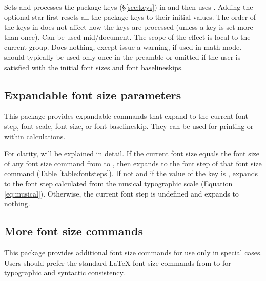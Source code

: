 \documentclass{beery}
\begin{document}
Sets and processes the  package keys (\S\ref{sec:keys}) in  and then uses .
Adding the optional star \sarg{} first resets all the  package keys to their initial values.
The order of the keys in  does not affect how the keys are processed (unless a key is set more than once).
Can be used mid\-/document.
The scope of the effect is local to the current group.
Does nothing, except issue a warning, if used in math mode.
 should typically be used only once in the preamble or omitted if the user is satisfied with the initial font sizes and font baselineskips.

\subsection{Expandable font size parameters}
\label{subsec:expandable}

\begin{mydisplaycode}
  \nopagebreak\newline
  \newline
  \nopagebreak\newline
\end{mydisplaycode}

This package provides expandable commands that expand to the current font step, font scale, font size, or font baselineskip.
They can be used for printing or within calculations.

For clarity,  will be explained in detail.
If the current font size equals the font size of any font size command from  to , then  expands to the font step of that font size command (Table \ref{table:fontsteps}).
If not and if the value of the key  is ,  expands to the font step calculated from the musical typographic scale (Equation \ref{eq:musical}).
Otherwise, the current font step is undefined and  expands to nothing.

\subsection{More font size commands}
\label{subsec:fontsize}

This package provides additional font size commands for use only in special cases.
Users should prefer the standard \LaTeX{} font size commands from  to  for typographic and syntactic consistency.
\end{document}
